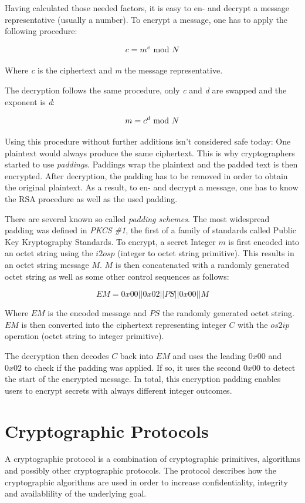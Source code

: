 Having calculated those needed factors, it is easy to en- and decrypt
a message representative (usually a number). To encrypt a message, one
has to apply the following procedure:

$$c = m^e \ \text{mod}\ N$$

Where \textit{c} is the ciphertext and \textit{m} the message representative.

The decryption follows the same procedure, only \textit{c} and \textit{d} are
swapped and the exponent is \textit{d}:

$$m = c^d \ \text{mod}\ N$$

Using this procedure without further additions isn't considered safe today:
One plaintext would always produce the same ciphertext. This is why cryptographers
started to use \textit{paddings}. Paddings wrap the plaintext and the padded
text is then encrypted. After decryption, the padding has to be removed in order
to obtain the original plaintext. As a result, to en- and decrypt a message, one
has to know the RSA procedure as well as the used padding.

There are several known so called \textit{padding schemes}. The most widespread
padding was defined in \textit{PKCS \#1}, the first of a family of standards
called Public Key Kryptography Standards. To encrypt, a secret Integer $m$ is 
first encoded into an octet string using the $i2osp$ (integer to octet string 
primitive). This results in an octet string message $M$. $M$ is then
concatenated with a randomly generated octet string as well as some other control
sequences as follows:

$$EM = 0x00 || 0x02 || PS || 0x00 || M$$

Where $EM$ is the encoded message and $PS$ the randomly generated octet string.
$EM$ is then converted into the ciphertext representing integer $C$ with the $os2ip$
operation (octet string to integer primitive).

The decryption then decodes $C$ back into $EM$ and 
uses the leading $0x00$ and $0x02$ to check if the padding was
applied. If so, it uses the second $0x00$ to detect the start of the encrypted
message. In total, this encryption padding enables users to encrypt secrets with
always different integer outcomes.

\section{Cryptographic Protocols}

A cryptographic protocol is a combination of cryptographic primitives,
algorithms and possibly other cryptographic protocols. The protocol describes
how the cryptographic algorithms are used in order to increase confidentiality,
integrity and availablility of the underlying goal.

